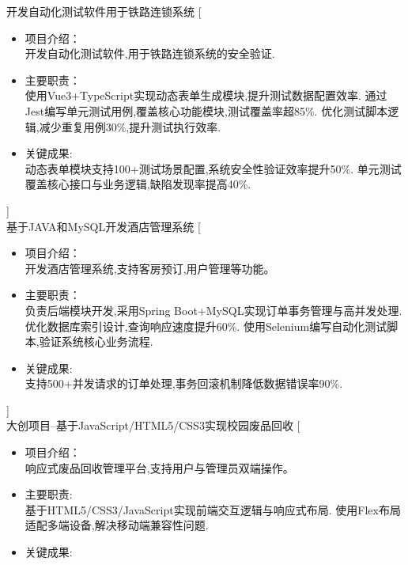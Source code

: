 \documentclass[zh]{resume}
\begin{document}
\begin{experiences}
  {开发自动化测试软件用于铁路连锁系统}%
  [\begin{itemize}
    \item 项目介绍：\\
    开发自动化测试软件,用于铁路连锁系统的安全验证.
    \item 主要职责：\\
    使用Vue3+TypeScript实现动态表单生成模块,提升测试数据配置效率.
    通过Jest编写单元测试用例,覆盖核心功能模块,测试覆盖率超85\%.
    优化测试脚本逻辑,减少重复用例30\%,提升测试执行效率.
    \item 关键成果: \\
    动态表单模块支持100+测试场景配置,系统安全性验证效率提升50\%.
    单元测试覆盖核心接口与业务逻辑,缺陷发现率提高40\%.
  \end{itemize}]
  \\
  {基于JAVA和MySQL开发酒店管理系统}%
  [\begin{itemize}
    \item 项目介绍：\\
    开发酒店管理系统,支持客房预订,用户管理等功能。
    \item 主要职责：\\
    负责后端模块开发,采用Spring Boot+MySQL实现订单事务管理与高并发处理.
    优化数据库索引设计,查询响应速度提升60\%.
    使用Selenium编写自动化测试脚本,验证系统核心业务流程.     
    \item 关键成果: \\
    支持500+并发请求的订单处理,事务回滚机制降低数据错误率90\%.
  \end{itemize}]
  \\
  {大创项目--基于JavaScript/HTML5/CSS3实现校园废品回收}%
  [\begin{itemize}
    \item 项目介绍：\\
    响应式废品回收管理平台,支持用户与管理员双端操作。
    \item 主要职责: \\
    基于HTML5/CSS3/JavaScript实现前端交互逻辑与响应式布局.
    使用Flex布局适配多端设备,解决移动端兼容性问题.
    \item 关键成果: \\

\end{itemize}
\end{experiences}
\end{document}
